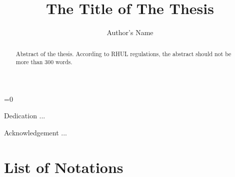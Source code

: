 \documentclass[pdf,watermark]{isg-thesis}
\author{Author's Name}
\title{The Title of The Thesis}
\def\chapterPrinting{0}
\begin{document}
\ifnum\chapterPrinting=0

\maketitle
\declaration

\begin{dedication}
Dedication ...
\end{dedication}

\begin{acknowledgement}
Acknowledgement ...
\end{acknowledgement}

\begin{abstract}
Abstract of the thesis. According to RHUL regulations, 
the abstract should not be more than 300 words.
\end{abstract}

\dominitoc %
\doparttoc %
\tableofcontents 
\listoffigures \clearpage
\listoftables \clearpage

\chapter*{List of Notations}

\clearpage

\end{document}
